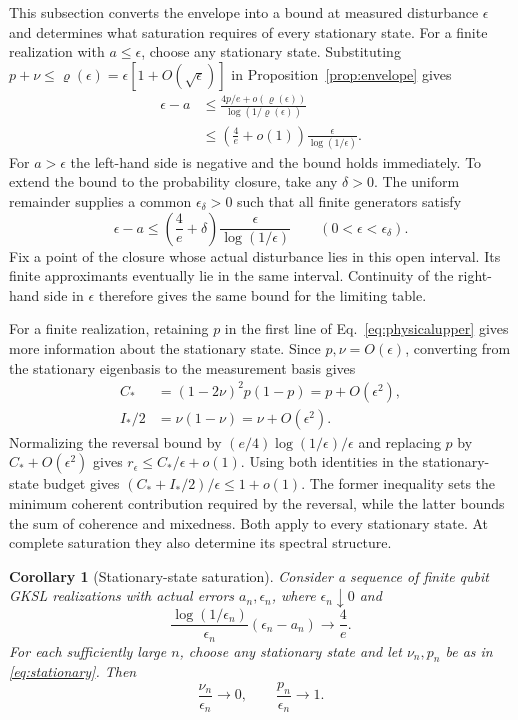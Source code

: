 \documentclass[aps,pra,reprint,amsmath,amssymb,nofootinbib,floatfix,longbibliography]{revtex4-2}
\theoremstyle{aps}
\newtheorem{corollary}[theorem]{Corollary}
\newcommand{\eps}{\epsilon}
\begin{document}
This subsection converts the envelope into a bound at measured disturbance $\eps$ and determines what saturation requires of every stationary state. For a finite realization with $a\le\eps$, choose any stationary state. Substituting $p+\nu\le\varrho(\eps)=\eps[1+O(\sqrt\eps)]$ in Proposition~\ref{prop:envelope} gives
\begin{equation}\label{eq:physicalupper}
 \begin{aligned}
 \eps-a&\le\frac{4p/e+o(\varrho(\eps))}{\log(1/\varrho(\eps))}\\
 &\le\left(\frac4e+o(1)\right)\frac\eps{\log(1/\eps)} .
 \end{aligned}
\end{equation}
For $a>\eps$ the left-hand side is negative and the bound holds immediately. To extend the bound to the probability closure, take any $\delta>0$. The uniform remainder supplies a common $\eps_\delta>0$ such that all finite generators satisfy
\begin{equation}\label{eq:finiteuniform}
 \eps-a\le\left(\frac4e+\delta\right)
 \frac\eps{\log(1/\eps)}\qquad(0<\eps<\eps_\delta).
\end{equation}
Fix a point of the closure whose actual disturbance lies in this open interval. Its finite approximants eventually lie in the same interval. Continuity of the right-hand side in $\eps$ therefore gives the same bound for the limiting table.

For a finite realization, retaining $p$ in the first line of Eq.~\eqref{eq:physicalupper} gives more information about the stationary state. Since $p,\nu=O(\eps)$, converting from the stationary eigenbasis to the measurement basis gives
\[
 \begin{aligned}
 C_*&=(1-2\nu)^2p(1-p)=p+O(\eps^2),\\
 I_*/2&=\nu(1-\nu)=\nu+O(\eps^2).
 \end{aligned}
\]
Normalizing the reversal bound by $(e/4)\log(1/\eps)/\eps$ and replacing $p$ by $C_*+O(\eps^2)$ gives $r_\eps\le C_*/\eps+o(1)$. Using both identities in the stationary-state budget gives $(C_*+I_*/2)/\eps\le1+o(1)$. The former inequality sets the minimum coherent contribution required by the reversal, while the latter bounds the sum of coherence and mixedness. Both apply to every stationary state. At complete saturation they also determine its spectral structure.

\begin{corollary}[Stationary-state saturation]\label{cor:saturation}
Consider a sequence of finite qubit GKSL realizations with actual errors $a_n,\eps_n$, where $\eps_n\downarrow0$ and
\begin{equation}\label{eq:saturation}
 \frac{\log(1/\eps_n)}{\eps_n}(\eps_n-a_n)\longrightarrow\frac4e.
\end{equation}
For each sufficiently large $n$, choose any stationary state and let $\nu_n,p_n$ be as in \eqref{eq:stationary}. Then
\begin{equation}\label{eq:rigidity}
 \frac{\nu_n}{\eps_n}\longrightarrow0,
 \qquad\frac{p_n}{\eps_n}\longrightarrow1.
\end{equation}
\end{corollary}
\end{document}
